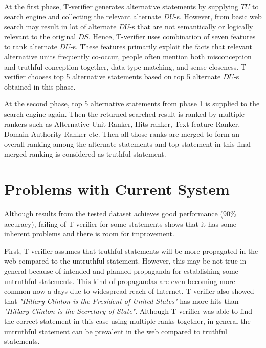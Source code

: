 \documentclass[12pt]{article}
\begin{document}
At the first phase, T-verifier generates alternative statements by supplying
$TU$ to search engine and collecting the relevant alternate $DU$-s. However,
from basic web search may result in lot of alternate $DU$-s that are not semantically or
logically relevant to the original $DS$. Hence, T-verifier uses combination of
seven features to rank alternate $DU$-s. These features primarily exploit the facts
that relevant alternative units frequently co-occur, people often mention both
misconception and truthful conception together, data-type matching, and
sense-closeness. T-verifier chooses top 5 alternative statements based on top 5
alternate $DU$-s obtained in this phase.

At the second phase, top 5 alternative statements from phase 1 is supplied to the
search engine again. Then the returned searched result is ranked by multiple
rankers such as Alternative Unit Ranker, Hits ranker, Text-feature Ranker, Domain
Authority Ranker etc. Then all those ranks are merged to form an overall ranking
among the alternate statements and top statement in this final merged ranking is
considered as truthful statement.


\section{Problems with Current System}
Although results from the tested dataset achieves good performance (90\%
accuracy), failing of T-verifier for some statements shows that it has some
inherent problems and there is room for improvement.

First, T-verifier assumes that truthful statements will be more propagated in the
web compared to the untruthful statement. However, this may be not true in
general because of intended and planned propaganda for establishing some
untruthful statements. This kind of propagandas are even becoming more common now
a days due to widespread reach of Internet. T-verifier also showed that \emph{"Hillary
Clinton is the President of United States"} has more hits than \emph{"Hillary Clinton is
the Secretary of State"}. Although T-verifier was able to find the correct
statement in this case using multiple ranks together, in general the untruthful
statement can be prevalent in the web compared to truthful statements.
\end{document}
